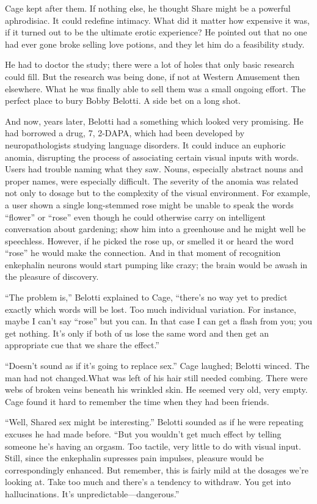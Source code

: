Cage kept after them. If nothing else, he thought Share might be a powerful aphrodisiac. It could redefine intimacy. What did it matter how expensive it was, if it turned out to be the ultimate erotic experience? He pointed out that no one had ever gone broke selling love potions, and they let him do a feasibility study.

He had to doctor the study; there were a lot of holes that only basic research could fill. But the research was being done, if not at Western Amusement then elsewhere. What he was finally able to sell them was a small ongoing effort. The perfect place to bury Bobby Belotti. A side bet on a long shot.

And now, years later, Belotti had a something which looked very promising. He had borrowed a drug, 7, 2-DAPA, which had been developed by neuropathologists studying language disorders. It could induce an euphoric anomia, disrupting the process of associating certain visual inputs with words. Users had trouble naming what they saw. Nouns, especially abstract nouns and proper names, were especially difficult. The severity of the anomia was related not only to dosage but to the complexity of the visual environment. For example, a user shown a single long-stemmed rose might be unable to speak the words ``flower'' or ``rose'' even though he could otherwise carry on intelligent conversation about gardening; show him into a greenhouse and he might well be speechless. However, if he picked the rose up, or smelled it or heard the word ``rose'' he would make the connection. And in that moment of recognition enkephalin neurons would start pumping like crazy; the brain would be awash in the pleasure of discovery.

``The problem is,'' Belotti explained to Cage, ``there's no way yet to predict exactly which words will be lost. Too much individual variation. For instance, maybe I can't say ``rose'' but you can. In that case I can get a flash from you; you get nothing. It's only if both of us lose the same word and then get an appropriate cue that we share the effect.''

``Doesn't sound as if it's going to replace sex.'' Cage laughed; Belotti winced. The man had not changed.What was left of his hair still needed combing. There were webs of broken veins beneath his wrinkled skin. He seemed very old, very empty. Cage found it hard to remember the time when they had been friends.

``Well, Shared sex might be interesting.'' Belotti sounded as if he were repeating excuses he had made before. ``But you wouldn't get much effect by telling someone he's having an orgasm. Too tactile, very little to do with visual input. Still, since the enkephalin supresses pain impulses, pleasure would be correspondingly enhanced. But remember, this is fairly mild at the dosages we're looking at. Take too much and there's a tendency to withdraw. You get into hallucinations. It's unpredictable---dangerous.''

